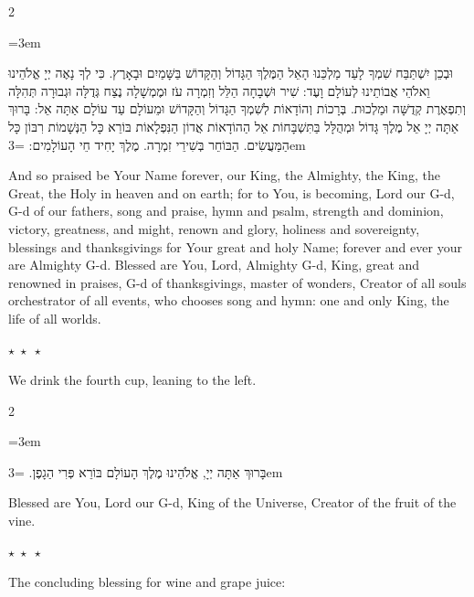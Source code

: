 \documentclass[11pt, openany]{book}
\newcommand{\instruction}[1]{%
  \par\vspace{3pt}
  \begin{tcolorbox}[
    enhanced,
    breakable,
    colback=sederlight,
    colframe=sedergold!40,
    boxrule=1pt,
    left=10pt,
    right=6pt,
    top=4pt,
    bottom=4pt,
    borderline west={3pt}{0pt}{sederwine!60},
    arc=6pt,
    outer arc=6pt,
  ]
    {\kidsinstructionfont\small\textcolor{sederwine}{#1}}
  \end{tcolorbox}
  \par\vspace{2pt}
}
\newcommand{\sederdivider}{%
  \par\vspace{6pt}
  \begin{center}
    \textcolor{sedergold}{\large$\star\;\star\;\star$}
  \end{center}
  \par\vspace{6pt}
}
\newenvironment{bilingual}{%
  \par\vspace{4pt}%
  \begin{paracol}{2}%
}{%
  \end{paracol}%
  \par\vspace{2pt}%
}
\newenvironment{hebrewcol}{%
  \switchcolumn[1]%
  \begingroup
  \RTL
  \hebrewfont\large
  \setstretch{1.4}%
  \emergencystretch=3em
  \tolerance=9999
  \parindent=0pt\relax
}{%
  \endRTL
  \endgroup
}
\newenvironment{englishcol}{%
  \switchcolumn[0]%
  \begingroup
  \setstretch{1.4}%
  \emergencystretch=3em
  \tolerance=9999
  \normalsize
  \rightskip=0.12in\relax
}{%
  \endgroup
}
\begin{document}
\begin{bilingual}
\begin{hebrewcol}
וּבְכֵן יִשְׁתַּבַּח שִׁמְךָ לָעַד מַלְכֵּנוּ הָאֵל הַמֶּלֶךְ הַגָּדוֹל וְהַקָּדוֹשׁ בַּשָּׁמַיִם וּבָאָרֶץ. כִּי לְךָ נָאֶה יְיָ אֱלֹהֵינוּ וֵאלֹהֵי אֲבוֹתֵינוּ לְעוֹלָם וָעֶד: שִׁיר וּשְׁבָחָה הַלֵּל וְזִמְרָה עֹז וּמֶמְשָׁלָה נֶצַח גְּדֻלָּה וּגְבוּרָה תְּהִלָּה וְתִפְאֶרֶת קְדֻשָּׁה וּמַלְכוּת. בְּרָכוֹת וְהוֹדָאוֹת לְשִׁמְךָ הַגָּדוֹל וְהַקָּדוֹשׁ וּמֵעוֹלָם עַד עוֹלָם אַתָּה אֵל: בָּרוּךְ אַתָּה יְיָ אֵל מֶלֶךְ גָּדוֹל וּמְהֻלָּל בַּתִּשְׁבָּחוֹת אֵל הַהוֹדָאוֹת אֲדוֹן הַנִּפְלָאוֹת בּוֹרֵא כָּל הַנְּשָׁמוֹת רִבּוֹן כָּל הַמַּעֲשִׂים. הַבּוֹחֵר בְּשִׁירֵי זִמְרָה. מֶלֶךְ יָחִיד חֵי הָעוֹלָמִים:
\end{hebrewcol}
\begin{englishcol}
And so praised be Your Name forever, our King, the Almighty, the King, the Great, the Holy in heaven and on earth; for to You, is becoming, Lord our G-d, G-d of our fathers, song and praise, hymn and psalm, strength and dominion, victory, greatness, and might, renown and glory, holiness and sovereignty, blessings and thanksgivings for Your great and holy Name; forever and ever your are Almighty G-d. Blessed are You, Lord, Almighty G-d, King, great and renowned in praises, G-d of thanksgivings, master of wonders, Creator of all souls orchestrator of all events, who chooses song and hymn: one and only King, the life of all worlds.
\end{englishcol}
\end{bilingual}
\sederdivider

\instruction{We drink the fourth cup, leaning to the left.}

\begin{bilingual}
\begin{hebrewcol}
בָּרוּךְ אַתָּה יְיָ, אֱלֹהֵינוּ מֶלֶךְ הָעוֹלָם בּוֹרֵא פְּרִי הַגָפֶן.
\end{hebrewcol}
\begin{englishcol}
Blessed are You, Lord our G-d, King of the Universe, Creator of the fruit of the vine.
\end{englishcol}
\end{bilingual}

\sederdivider

\instruction{The concluding blessing for wine and grape juice:}
\end{document}
